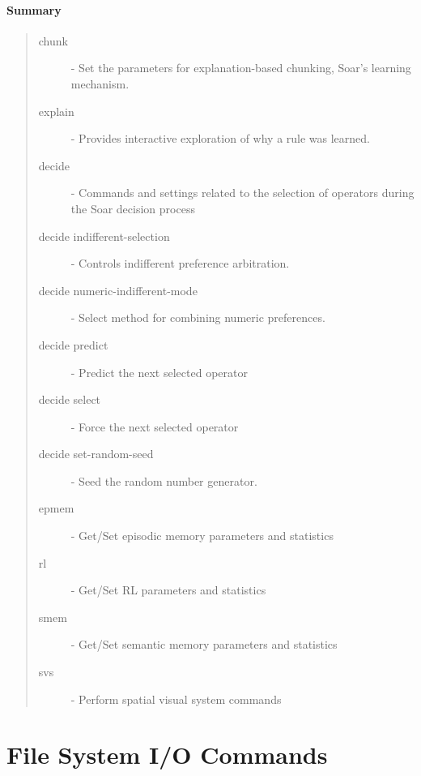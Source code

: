 \paragraph{Summary}
\begin{quote}
\begin{description}
\item[chunk] - Set the parameters for explanation-based chunking, Soar's learning mechanism.
\item[explain] - Provides interactive exploration of why a rule was learned.
\item[decide ] - Commands and settings related to the selection of operators during the Soar decision process
\item[decide indifferent-selection] -  Controls indifferent preference arbitration.
\item[decide numeric-indifferent-mode] - Select method for combining numeric preferences.
\item[decide predict] - Predict the next selected operator 
\item[decide select] - Force the next selected operator 
\item[decide set-random-seed] - Seed the random number generator.
\item[epmem] - Get/Set episodic memory parameters and statistics
\item[rl] - Get/Set RL parameters and statistics 
\item[smem] - Get/Set semantic memory parameters and statistics
\item[svs] - Perform spatial visual system commands
\end{description}
\end{quote}

\divider 


\divider 


\divider 


\divider 


\divider 


\divider 


\divider 


\divider 


\section{File System I/O Commands}
\label{FILE-IO}

